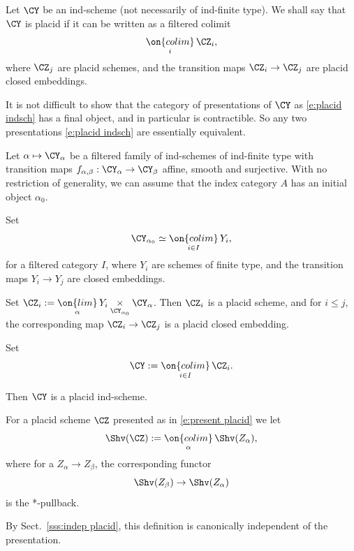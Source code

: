 \documentclass[9pt]{amsart}
\theoremstyle{definition}
\theoremstyle{remark}
\newcommand{\secref}[1]{Sect.~\ref{#1}}
\numberwithin{equation}{section}
\begin{document}
\sssec{}

Let $\CY$ be an ind-scheme (not necessarily of ind-finite type). We shall say that $\CY$ is placid if it can be written
as a filtered colimit
\begin{equation} \label{e:placid indsch}
\underset{i}{\on{colim}}\, \CZ_i,
\end{equation} 
where $\CZ_j$ are placid schemes, and the transition maps $\CZ_i\to \CZ_j$ are placid closed embeddings.

\sssec{}  \label{sss:indep placid indsch}

It is not difficult to show that  the category of presentations of $\CY$ as \eqref{e:placid indsch}
has a final object, and in particular is contractible. So any two presentations \eqref{e:placid indsch} are essentially
equivalent.

\sssec{}  \label{sss:ind-pro}

Let $\alpha\mapsto \CY_\alpha$ be a filtered family of ind-schemes of ind-finite type with transition maps 
$f_{\alpha,\beta}:\CY_\alpha\to \CY_\beta$ affine, smooth and surjective. With no restriction of generality, we can assume that
the index category $A$ has an initial object $\alpha_0$. 

\medskip

Set $$\CY_{\alpha_0}\simeq \underset{i\in I}{\on{colim}}\, Y_i,$$
for a filtered category $I$, where $Y_i$ are schemes of finite type, and the transition maps
$Y_i\to Y_j$ are closed embeddings. 

\medskip

Set $\CZ_i:=\underset{\alpha}{\on{lim}}\, Y_i\underset{\CY_{\alpha_0}}\times \CY_\alpha$. Then 
$\CZ_i$ is a placid scheme, and for $i\leq j$, the corresponding map $\CZ_i\to \CZ_j$
is a placid closed embedding. 

\medskip

Set 
$$\CY:=\underset{i\in I}{\on{colim}}\, \CZ_i.$$

Then $\CY$ is a placid ind-scheme. 


\sssec{}

For a placid scheme $\CZ$ presented as in \eqref{e:present placid}
we let
$$\Shv(\CZ):=\underset{\alpha}{\on{colim}}\, \Shv(Z_\alpha),$$
where for a $Z_\alpha\to Z_\beta$, the corresponding functor 
$$\Shv(Z_\beta)\to \Shv(Z_\alpha)$$ 
is the *-pullback.

\medskip

By \secref{sss:indep placid}, this definition is canonically independent of the presentation. 
\end{document}
